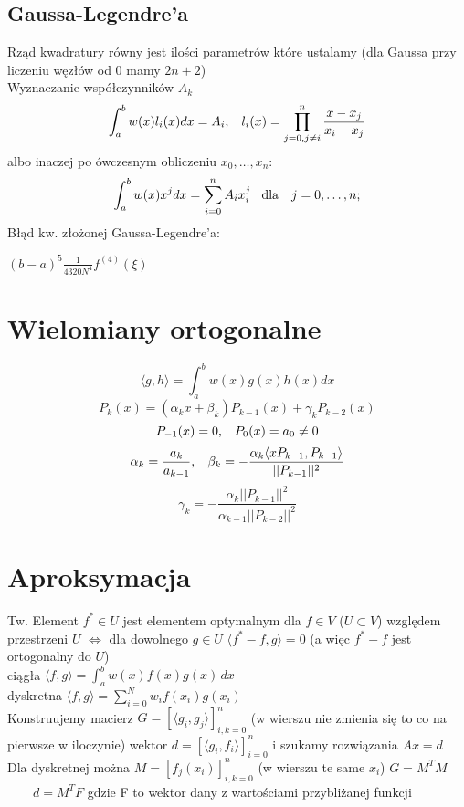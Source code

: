 \documentclass[twocolumn]{article}
\begin{document}
\begin{flushleft}
\subsection{Gaussa-Legendre’a}
Rząd kwadratury równy jest ilości parametrów które ustalamy (dla Gaussa przy liczeniu węzłów od 0 mamy $2n+2$)\\
Wyznaczanie współczynników $A_k$ \\
$$
\int^b_a w(x)l_i(x)dx=A_i, \hspace{3mm} l_i(x)=\prod_{j=0,j\neq i}^{n}\frac{x-x_j}{x_i-x_j}
$$
albo inaczej po ówczesnym obliczeniu $x_0,\dotsc,x_n$:\\
$$
\int^b_a w(x)x^jdx=\sum_{i=0}^nA_ix_i^j \hspace{3mm} \text{dla} \ \ \ j = 0 ,\dotsc, n;
$$
Błąd kw. złożonej Gaussa-Legendre’a:\\
\begin{center}
$(b-a)^5\frac{1}{4320N^4}f^{(4)}(\xi)$
\end{center}

\section{Wielomiany ortogonalne}
$$\langle g,h\rangle= \int_{a}^{b} w(x)g(x)h(x)dx$$
$$P_k (x) = ( \alpha_k x + \beta_k )P_{k-1} (x) + \gamma_k P_{k-2} (x)$$
$$P_{-1} (x) = 0, \hspace{3mm} P_0 (x) = a_0 \neq 0$$
$$\alpha_k = \frac{ a_k }{ a_{k-1} },\hspace{3mm} \beta_k = -\frac{ \alpha_k  \langle xP_{k-1} , P_{k-1} \rangle } { ||P_{k-1}||^2 }$$
$$ \gamma_k = -\frac{ \alpha_k ||P_{k-1}||^2}{ \alpha_{k-1} ||P_{k-2}||^2}$$

\section{Aproksymacja}
Tw. Element $f^* \in U$ jest elementem optymalnym dla $f\in V$ ($U \subset V$) względem przestrzeni $U$ $\iff$ dla dowolnego $g \in U$ $\langle f^* -f,g\rangle = 0$ (a więc $f^* -f$ jest ortogonalny do $U$)\\
\vspace{3mm}
ciągła $\langle f,g \rangle = \int_a^b w(x)f(x)g(x) \,dx$\\
dyskretna $\langle f,g \rangle = \sum_{i=0}^Nw_if(x_i)g(x_i)$\\\vspace{3mm}
Konstruujemy macierz $G = \left[\langle g_i,g_j \rangle\right]_{i,k = 0}^n$ (w wierszu nie zmienia się to co na pierwsze w iloczynie) wektor $d = \left[\langle g_i, f_i\rangle \right]_{i = 0}^n$ i szukamy rozwiązania $Ax=d$\\
Dla dyskretnej można $M = \left[f_j(x_i)\right]_{i,k = 0}^n$ (w wierszu te same $x_i$) $G = M^TM$ \ \ \ \  $d = M^TF$ gdzie F to wektor dany z wartościami przybliżanej funkcji

\end{flushleft}
\end{document}

